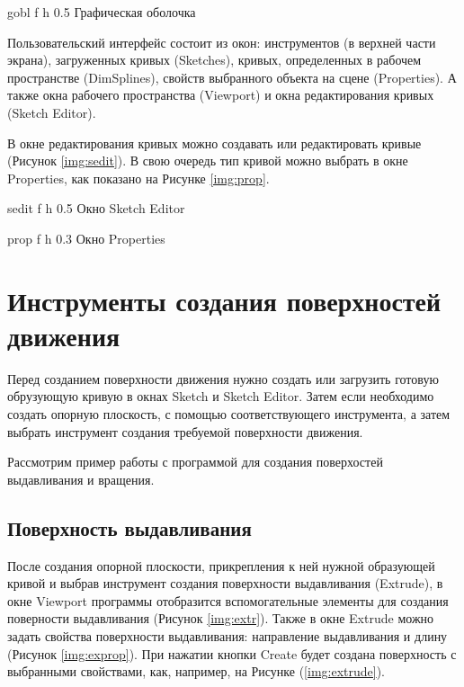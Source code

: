 \documentclass{bmstu}
\begin{document}
{gobl} %
{f} %
{h} %
{0.5\textwidth} %
{Графическая оболочка} %

Пользовательский интерфейс состоит из окон: инструментов (в верхней части экрана), загруженных кривых (Sketches), кривых, определенных в рабочем пространстве (DimSplines), свойств выбранного объекта на сцене (Properties). А также окна рабочего пространства (Viewport) и окна редактирования кривых (Sketch Editor).

В окне редактирования кривых можно создавать или редактировать кривые (Рисунок \ref{img:sedit}). В свою очередь тип кривой можно выбрать в окне Properties, как показано на Рисунке \ref{img:prop}.

{sedit} %
{f} %
{h} %
{0.5\textwidth} %
{Окно Sketch Editor} %

{prop} %
{f} %
{h} %
{0.3\textwidth} %
{Окно Properties} %

\section{Инструменты создания поверхностей движения}

Перед созданием поверхности движения нужно создать или загрузить готовую обрузующую кривую в окнах Sketch и Sketch Editor. Затем если необходимо создать опорную плоскость, с помощью соответствующего инструмента, а затем выбрать инструмент создания требуемой поверхности движения.

Рассмотрим пример работы с программой для создания поверхостей выдавливания и вращения.

\subsection{Поверхность выдавливания}

После создания опорной плоскости, прикрепления к ней нужной образующей кривой и выбрав инструмент создания поверхности выдавливания (Extrude), в окне Viewport программы отобразится вспомогательные элементы для создания поверности выдавливания (Рисунок \ref{img:extr}). Также в окне Extrude можно задать свойства поверхности выдавливания: направление выдавливания и длину (Рисунок \ref{img:exprop}). При нажатии кнопки Create будет создана поверхность с выбранными свойствами, как, например, на Рисунке (\ref{img:extrude}).
\end{document}
